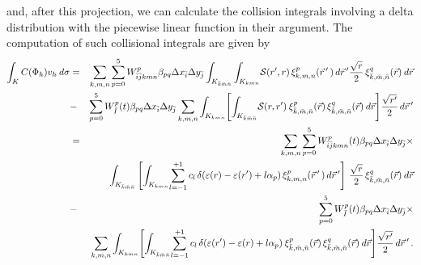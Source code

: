 \documentclass[11pt]{article}
\newcommand{\eps}{\varepsilon}
\newcommand{\cd}[1]{c_{#1}}
\newcommand{\alp}{\alpha_{p}}
\newcommand{\ib}{\bar{i}} %
\newcommand{\jb}{\bar{j}} %
\newcommand{\kb}{\bar{k}} %
\newcommand{\mb}{\bar{m}} %
\newcommand{\nb}{\bar{n}} %
\begin{document}
and, after this projection, we can calculate the collision integrals involving a delta distribution
with the piecewise linear function in their argument. 
The computation of such collisional integrals are given by
\begin{eqnarray}
\int_K C(\Phi_h) v_h \: d\sigma  
& = & 
\sum_{k,m,n} \sum_{p=0}^{5} 
W_{\ib \jb kmn}^p \beta_{p q} \Delta x_{\ib} \Delta y_{\jb}  
\int_{K_{\kb \mb \nb}} 
 \int_{K_{k m n}} \!
{\cal S}(r', r ) \, \xi^{p}_{k,m,n}(\vec{r}\,'\,) \,
d\vec{r}\,'
\frac{\sqrt{r}}{2} \,
\xi^{q}_{\kb,\mb,\nb}(\vec{r}) \: 
 d\vec{r} 
\nonumber\\
& -  &  
\sum_{p=0}^{5} W_{{\bar{I}}}^p(t)
 \beta_{p q}  \Delta x_{\ib}  \Delta y_{\jb}
\sum_{k,m,n} 
\int_{K_{k m n}} \! 
\left[ 
\int_{K_{\kb \mb \nb}} \!
{\cal S}(r, r' ) \: 
\xi^{p}_{\kb,\mb,\nb}(\vec{r}) \,
\xi^{q}_{\kb,\mb,\nb}(\vec{r}) \:
d\vec{r}  
\right] \!
\frac{\sqrt{r'}}{2} \,
d\vec{r}\,'\nonumber \\
& = &  
\sum_{k,m,n} \sum_{p=0}^{5} 
W_{\ib \jb kmn}^p(t) \beta_{p q} \Delta x_{\ib} \Delta y_{\jb}  
\times \\
& &
\int_{K_{\kb \mb \nb}} \left[ 
 \int_{K_{k m n}} \!
\sum_{l=-1}^{+1} \cd{l} \, \delta( \eps(r) - \eps(r') + l \alp) \, \xi^{p}_{k,m,n}(\vec{r}\,'\,) \,
d\vec{r}\,'\right] \,  \frac{\sqrt{r}}{2} \,
\xi^{q}_{\kb,\mb,\nb}(\vec{r}) \: 
 d\vec{r} 
\nonumber\\
& - & 
\sum_{p=0}^{5} W_{{\bar{I}}}^p(t)
 \beta_{p q}  \Delta x_{\ib}  \Delta y_{\jb}
\times \nonumber \\
& & 
\sum_{k,m,n} 
\int_{K_{k m n}} \! 
\left[ 
\int_{K_{\kb \mb \nb}} \!
\sum_{l=-1}^{+1} \cd{l} \, \delta( \eps(r') - \eps(r) + l \alp) \: 
\xi^{p}_{\kb,\mb,\nb}(\vec{r}) \,
\xi^{q}_{\kb,\mb,\nb}(\vec{r}) \:
d\vec{r}  
\right] \! 
\frac{\sqrt{r'}}{2} \,
d\vec{r}\,' \, . \nonumber %
\end{eqnarray}
\end{document}
